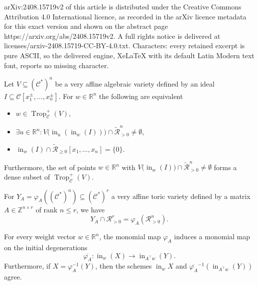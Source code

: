 \documentclass[10pt,a4paper]{amsart}
\DeclareMathOperator{\Trop}{Trop}
\DeclareMathOperator{\initial}{in}
\newcommand{\CC}{\mathcal{C}}
\newcommand{\RR}{\mathcal{R}}
\newcommand{\inw}{\operatorname{in}_w}
\begin{document}
arXiv:2408.15719v2 of this article is distributed under the Creative Commons Attribution 4.0 International licence, as recorded in the arXiv licence metadata for this exact version and shown on the abstract page https://arxiv.org/abs/2408.15719v2. A full rights notice is delivered at licenses/arxiv-2408.15719-CC-BY-4.0.txt. Characters: every retained excerpt is pure ASCII, so the delivered engine, XeLaTeX with its default Latin Modern text font, reports no missing character.
\begin{proposition}
\label{Prop::CharWeakSigned}
Let  $V \subseteq (\CC^*)^n$ be a very affine algebraic variety defined by an ideal $I \subseteq \mathcal{C}[x_1^\pm, \dots , x_n^\pm]$. For $w \in \mathbb{R}^n$ the following are equivalent
\begin{itemize}
    \item[(i)] $ w \in \Trop_\CC^+(V)$,
    \item[(ii)] $\exists u \in \mathbb{R}^n \colon V\big( \initial_u(\initial_w(I)) \big) \cap \widetilde{\mathcal{R}}^{n}_{>0} \neq \emptyset$,
    \item[(iii)] $\initial_w(I) \cap \widetilde{\mathcal{R}}_{\geq 0}[x_1, \dots , x_n] = \{ 0 \} $.
\end{itemize}
 Furthermore, the set of points $w \in \mathbb{R}^n$ with $V\big( \initial_w(I) \big) \cap \widetilde{\mathcal{R}}^{n}_{>0} \neq \emptyset $ forms a dense subset of $\Trop_\CC^+(V)$.
\end{proposition}

\begin{proposition}
\label{prop: positive part of toric vars}
For $Y_A =  \varphi_A \left( (\CC^*)^n \right)  \subseteq (\mathcal{C}^*)^r$ a very affine toric variety defined by a matrix $A \in \mathbb{Z}^{n \times r}$ of rank $n \leq r$, we have
\[ Y_A \cap \RR^r_{>0} = \varphi_A(\RR^n_{>0}).\]
\end{proposition}

\begin{lemma}
\label{lemma: induced map of initial degs}
For every weight vector $w \in \mathbb{R}^n$,
the monomial map $\varphi_A$ induces a monomial map on the initial degenerations
\[
\overline{\varphi_A}\colon \inw (X) \longrightarrow \initial_{A^{\top}w} (Y).
\]
Furthermore, if $X = \varphi_A^{-1}(Y)$, then
the schemes $\inw X $ and 
$\overline{\varphi_A}^{-1}(\initial_{A^\top w} (Y))$ agree.
\end{lemma}
\end{document}
